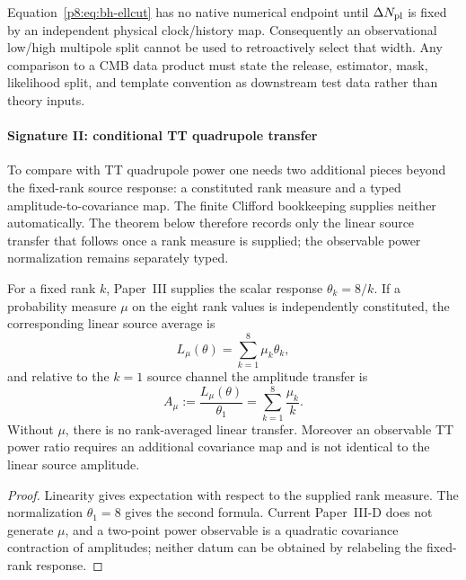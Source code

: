 \documentclass[12pt,a4paper]{article}
\begin{document}
\begin{remark}
Equation~\eqref{p8:eq:bh-ellcut} has no native numerical endpoint until
\(\Delta N_{\rm pl}\) is fixed by an independent physical clock/history map.
Consequently an observational low/high multipole split cannot be used to
retroactively select that width.  Any comparison to a CMB data product must
state the release, estimator, mask, likelihood split, and template convention
as downstream test data rather than theory inputs.
\end{remark}


\paragraph{Signature II: conditional TT quadrupole transfer}
\label{p8:subsec:bh-quadrupole}

To compare with TT quadrupole power one needs two additional pieces beyond the fixed-rank source response: a constituted rank measure and a typed amplitude-to-covariance map.  The finite Clifford bookkeeping supplies neither automatically.  The theorem below therefore records only the linear source transfer that follows once a rank measure is supplied; the observable power normalization remains separately typed.

\begin{theorem}
\label{p8:lem:bh-linear}
\label{p8:thm:unique-scalar-to-tt-trace}
For a fixed rank \(k\), Paper~III supplies the scalar response
\(\theta_k=8/k\).  If a probability measure \(\mu\) on the eight rank values
is independently constituted, the corresponding linear source average is
\begin{equation}
\label{p8:eq:unique-tt-trace-functional}
L_\mu(\theta)=\sum_{k=1}^8\mu_k\theta_k,
\end{equation}
and relative to the \(k=1\) source channel the amplitude transfer is
\begin{equation}
\label{p8:eq:unique-tt-trace-factor}
A_\mu:=\frac{L_\mu(\theta)}{\theta_1}
=\sum_{k=1}^8\frac{\mu_k}{k}.
\end{equation}
Without \(\mu\), there is no rank-averaged linear transfer.  Moreover an
observable TT power ratio requires an additional covariance map and is not
identical to the linear source amplitude.
\end{theorem}

\begin{proof}
Linearity gives expectation with respect to the supplied rank measure.  The
normalization \(\theta_1=8\) gives the second formula.  Current Paper~III-D
does not generate \(\mu\), and a two-point power observable is a quadratic
covariance contraction of amplitudes; neither datum can be obtained by
relabeling the fixed-rank response.
\end{proof}
\end{document}
